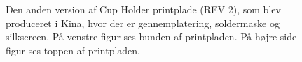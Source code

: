 \documentclass[HardwareDesign/HardwareDesign_main.tex]{subfiles}
\begin{document}
\begin{figure}[H]
\centering
{}
\caption{Den anden version af Cup Holder printplade (REV 2), som blev produceret i Kina, hvor der er gennemplatering, soldermaske og silkscreen. På venstre figur ses bunden af printpladen. På højre side figur ses toppen af printpladen.}
\label{fig:CupHolderRev2}
\end{figure}
\end{document}
